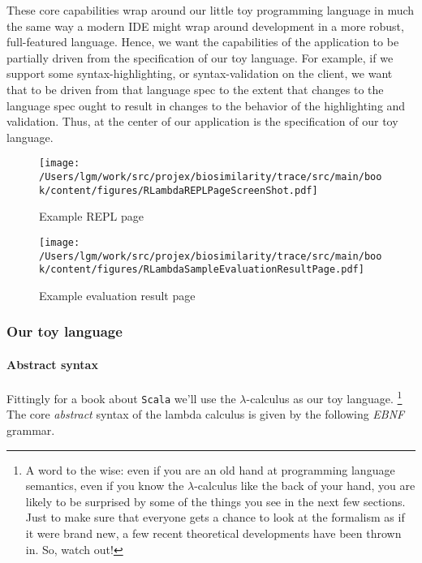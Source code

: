 These core capabilities wrap around our little toy programming
language in much the same way a modern IDE might wrap around
development in a more robust, full-featured language. Hence, we want
the capabilities of the application to be partially driven from the
specification of our toy language. For example, if we support some
syntax-highlighting, or syntax-validation on the client, we want that
to be driven from that language spec to the extent that changes to the
language spec ought to result in changes to the behavior of the
highlighting and validation. Thus, at the center of our application is
the specification of our toy language.

\begin{figure}[tbp]
\begin{center}
{ \texttt{[image: /Users/lgm/work/src/projex/biosimilarity/trace/src/main/book/content/figures/RLambdaREPLPageScreenShot.pdf]} }
\caption{ Example REPL page }
\end{center}
\end{figure}

\begin{figure}[tbp]
\begin{center}
{ \texttt{[image: /Users/lgm/work/src/projex/biosimilarity/trace/src/main/book/content/figures/RLambdaSampleEvaluationResultPage.pdf]} }
\caption{ Example evaluation result page }
\end{center}
\end{figure}

\subsubsection{Our toy language}

\paragraph{Abstract syntax}
Fittingly for a book about \texttt{Scala} we'll use the
$\lambda$-calculus as our toy language. \footnote{A word to the wise:
  even if you are an old hand at programming language semantics, even
  if you know the $\lambda$-calculus like the back of your hand, you
  are likely to be surprised by some of the things you see in the next
  few sections. Just to make sure that everyone gets a chance to look
  at the formalism as if it were brand new, a few recent theoretical
  developments have been thrown in. So, watch out!} The core
\textit{abstract} syntax of the lambda calculus is given by the
following \textit{EBNF} grammar.

